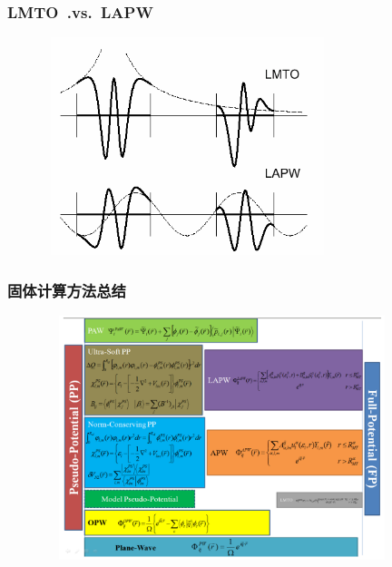 {\frame
{
	\frametitle{\textrm{LMTO~.vs.~LAPW}}
\begin{figure}[h!]
\centering
\vspace*{-0.15in}
\includegraphics[height=2.50in,width=3.30in,viewport=0 0 440 350,clip]{Figures/LMTO-vs-LAPW.png}
\caption{\fontsize{5.5pt}{4.2pt}}%
\label{LMTO-vs-LAPW}
\end{figure}
}

\frame
{
	\frametitle{固体计算方法总结}
\begin{figure}[h!]
\centering
\vspace*{-0.25in}
\includegraphics[height=2.80in,width=4.10in,viewport=0 0 1150 850,clip]{Figures/Pseudo-Full_Potential-2.png}
\label{Pseudo-Full_Poential}
\end{figure}
}

}

